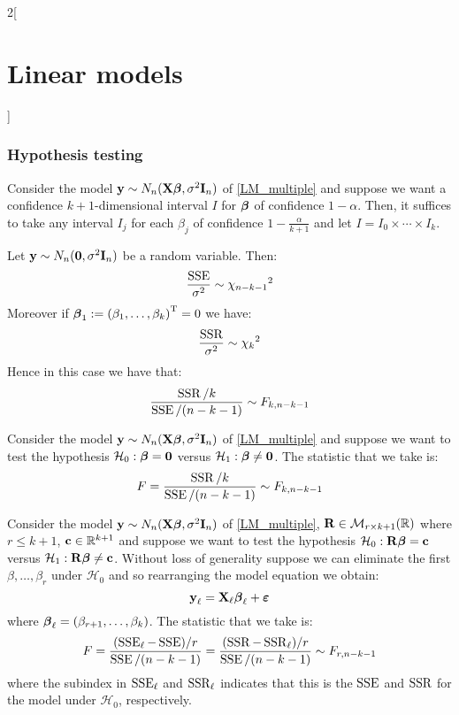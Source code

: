 \documentclass[../../../main_math.tex]{subfiles}
\begin{document}
\begin{multicols}{2}[\section{Linear models}]
  \subsubsection{Hypothesis testing}
  \begin{proposition}
    Consider the model $\boldsymbol{\mathrm{y}}\sim N_n(\boldsymbol{\mathrm{X\beta}},\sigma^2\boldsymbol{\mathrm{I}}_n)$ of \cref{LM_multiple} and suppose we want a confidence $k+1$-dimensional interval $I$ for $\boldsymbol{\mathrm{\beta}}$ of confidence $1-\alpha$. Then, it suffices to take any interval $I_j$ for each $\beta_j$ of confidence $1-\frac{\alpha}{k+1}$ and let $I=I_0\times\cdots\times I_{k}$.
  \end{proposition}
  \begin{theorem}
    Let $\boldsymbol{\mathrm{y}}\sim N_n(\boldsymbol{\mathrm{0}},\sigma^2\boldsymbol{\mathrm{I}}_n)$ be a random variable. Then:
    $$\frac{\operatorname{SSE}}{\sigma^2}\sim{\chi_{n-k-1}}^2$$
    Moreover if $\boldsymbol{\mathrm{\beta}}_1:={(\beta_1,\ldots,\beta_k)}^{\mathrm{T}}=0$ we have:
    $$\frac{\operatorname{SSR}}{\sigma^2}\sim{\chi_{k}}^2$$
    Hence in this case we have that: $$\frac{\operatorname{SSR}/ k}{\operatorname{SSE}/(n-k-1)}\sim F_{k,n-k-1}$$
  \end{theorem}
  \begin{proposition}
    Consider the model $\boldsymbol{\mathrm{y}}\sim N_n(\boldsymbol{\mathrm{X\beta}},\sigma^2\boldsymbol{\mathrm{I}}_n)$ of \cref{LM_multiple} and suppose we want to test the hypothesis $\mathcal{H}_0:\boldsymbol{\mathrm{\beta}}=\boldsymbol{\mathrm{0}}$ versus $\mathcal{H}_1:\boldsymbol{\mathrm{\beta}}\ne\boldsymbol{\mathrm{0}}$. The statistic that we take is: $$F=\frac{\operatorname{SSR}/ k}{\operatorname{SSE}/(n-k-1)}\sim F_{k,n-k-1}$$
  \end{proposition}
  \begin{proposition}
    Consider the model $\boldsymbol{\mathrm{y}}\sim N_n(\boldsymbol{\mathrm{X\beta}},\sigma^2\boldsymbol{\mathrm{I}}_n)$ of \cref{LM_multiple}, $\boldsymbol{\mathrm{R}}\in\mathcal{M}_{r\times {k+1}}(\mathbb{R})$ where $r\leq k+1$, $\boldsymbol{\mathrm{c}}\in\mathbb{R}^{k+1}$ and suppose we want to test the hypothesis $\mathcal{H}_0:\boldsymbol{\mathrm{R}}\boldsymbol{\mathrm{\beta}}=\boldsymbol{\mathrm{c}}$ versus $\mathcal{H}_1:\boldsymbol{\mathrm{R}}\boldsymbol{\mathrm{\beta}}\ne\boldsymbol{\mathrm{c}}$.
    Without loss of generality suppose we can eliminate the first $\beta,\ldots,\beta_r$ under $\mathcal{H}_0$ and so rearranging the model equation we obtain:
    $$\boldsymbol{\mathrm{y}}_\ell=\boldsymbol{\mathrm{X}}_\ell\boldsymbol{\mathrm{\beta}}_\ell+\boldsymbol{\mathrm{\varepsilon}}$$
    where $\boldsymbol{\mathrm{\beta}}_\ell=(\beta_{r+1},\ldots,\beta_k)$. The statistic that we take is:
    \begin{equation}\label{LM_hypothesisgen}
      F=\frac{(\operatorname{SSE}_\ell-\operatorname{SSE})/ r}{\operatorname{SSE}/(n-k-1)}=\frac{(\operatorname{SSR}-\operatorname{SSR}_\ell)/ r}{\operatorname{SSE}/(n-k-1)}\sim F_{r,n-k-1}
    \end{equation}
    where the subindex in $\operatorname{SSE}_\ell$ and $\operatorname{SSR}_\ell$ indicates that this is the $\operatorname{SSE}$ and $\operatorname{SSR}$ for the model under $\mathcal{H}_0$, respectively.
  \end{proposition}

\end{multicols}
\end{document}
